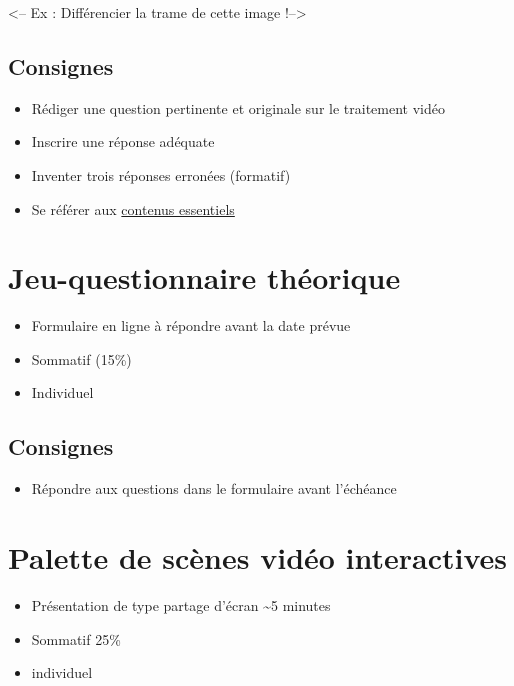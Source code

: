 \documentclass[
  french,
]{book}
\providecommand{\tightlist}{%
  \setlength{\itemsep}{0pt}\setlength{\parskip}{0pt}}
\begin{document}
\textless-- Ex : Différencier la trame de cette image !--\textgreater{}

\hypertarget{consignes-1}{%
\subsection{Consignes}\label{consignes-1}}

\begin{itemize}
\tightlist
\item
  Rédiger une question pertinente et originale sur le traitement vidéo
\item
  Inscrire une réponse adéquate
\item
  Inventer trois réponses erronées (formatif)
\item
  Se référer aux \href{}{contenus essentiels}
\end{itemize}

\hypertarget{sommatif_3}{%
\section{Jeu-questionnaire théorique}\label{sommatif_3}}

\begin{itemize}
\tightlist
\item
  Formulaire en ligne à répondre avant la date prévue
\item
  Sommatif (15\%)
\item
  Individuel
\end{itemize}

\hypertarget{consignes-2}{%
\subsection{Consignes}\label{consignes-2}}

\begin{itemize}
\tightlist
\item
  Répondre aux questions dans le formulaire avant l'échéance
\end{itemize}

\hypertarget{sommatif_4}{%
\section{Palette de scènes vidéo interactives}\label{sommatif_4}}

\begin{itemize}
\tightlist
\item
  Présentation de type partage d'écran \textasciitilde5 minutes
\item
  Sommatif 25\%
\item
  individuel
\end{itemize}
\end{document}

